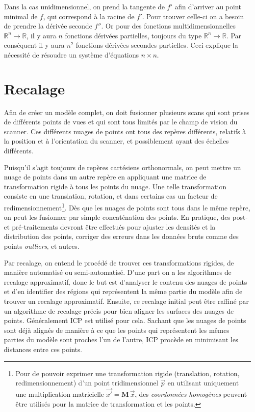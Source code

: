\documentclass[a4paper,10pt]{scrreprt}
\begin{document}
Dans la cas unidimensionnel, on prend la tangente de $f'$ afin d'arriver au point minimal de $f$, qui correspond à la racine de $f'$. Pour trouver celle-ci on a besoin de prendre la dérivée seconde $f''$. Or pour des fonctions multidimensionnelles $\mathbb{R}^n \rightarrow \mathbb{R}$, il y aura $n$ fonctions dérivées partielles, toujours du type $\mathbb{R}^n \rightarrow \mathbb{R}$. Par conséquent il y aura $n^2$ fonctions dérivées secondes partielles. Ceci explique la nécessité de résoudre un système d'équations $n \times n$.

\section{Recalage}
Afin de créer un modèle complet, on doit fusionner plusieurs scans qui sont prises de différents points de vues et qui sont tous limités par le champ de vision du scanner. Ces différents nuages de points ont tous des repères différents, relatifs à la position et à l'orientation du scanner, et possiblement ayant des échelles différents.

Puisqu'il s'agit toujours de repères cartésiens orthonormals, on peut mettre un nuage de points dans un autre repère en appliquant une matrice de transformation rigide à tous les points du nuage. Une telle transformation consiste en une translation, rotation, et dans certains cas un facteur de redimensionnement\footnote{Pour de pouvoir exprimer une transformation rigide (translation, rotation, redimensionnement) d'un point tridimensionnel $\vec{p}$ en utilisant uniquement une multiplication matricielle $\vec{x'} = \mathbf{M} \, \vec{x}$, des \emph{coordonnées homogènes} peuvent être utilisés pour la matrice de transformation et les points.}. Dès que les nuages de points sont tous dans le même repère, on peut les fusionner par simple concaténation des points. En pratique, des post- et pré-traitements devront être effectués pour ajuster les densités et la distribution des points, corriger des erreurs dans les données bruts comme des points \emph{outliers}, et autres.

Par recalage, on entend le procédé de trouver ces transformations rigides, de manière automatisé ou semi-automatisé. D'une part on a les algorithmes de recalage approximatif, donc le but est d'analyser le contenu des nuages de points et d'en identifier des régions qui représentent la même partie du modèle afin de trouver un recalage approximatif. Ensuite, ce recalage initial peut être raffiné par un algorithme de recalage précis pour bien aligner les surfaces des nuages de points. Généralement ICP est utilisé pour cela. Sachant que les nuages de points sont déjà alignés de manière à ce que les points qui représentent les mêmes parties du modèle sont proches l'un de l'autre, ICP procède en minimisant les distances entre ces points.
\end{document}
